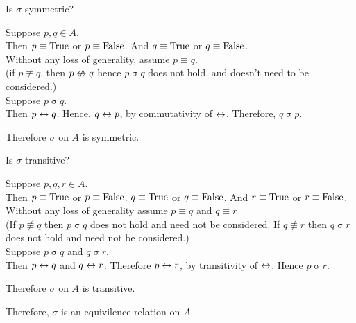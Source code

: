 \documentclass[a4paper, 11pt]{report}
\newcommand{\bisig}{\mathbin{\sigma}}
\begin{document}
Is $\bisig$ symmetric?
\begin{list}{}{\setlength{\leftmargin}{1in}\setlength{\topsep}{2pt}}\item\relax
  Suppose $p,q\in A$. \\
  Then $p\equiv\text{True}$ or $p\equiv\text{False}$. And $q\equiv\text{True}$ or $q\equiv\text{False}$. \\
  Without any loss of generality, assume $p\equiv q$. \\
  (if $p\not\equiv q$, then $p\notliff q$ hence $p\bisig q$ does not hold, and doesn't need to be considered.) \\
  Suppose $p\bisig q$. \\
  Then $p\leftrightarrow q$. Hence, $q\leftrightarrow p$, by commutativity of $\leftrightarrow$. Therefore, $q\bisig p$.

  Therefore $\bisig$ on $A$ is symmetric.
\end{list}

Is $\bisig$ transitive?
\begin{list}{}{\setlength{\leftmargin}{1in}\setlength{\topsep}{2pt}}\item\relax
  Suppose $p,q,r\in A$. \\
  Then $p\equiv\text{True}$ or $p\equiv\text{False}$. $q\equiv\text{True}$ or $q\equiv\text{False}$. And $r\equiv\text{True}$ or $r\equiv\text{False}$. \\
  Without any loss of generality assume $p\equiv q$ and $q\equiv r$ \\
  (If $p\not\equiv q$ then $p\bisig q$ does not hold and need not be considered. If $q\not\equiv r$ then $q\bisig r$ does not hold and need not be considered.) \\
  Suppose $p\bisig q$ and $q\bisig r$. \\
  Then $p\leftrightarrow q$ and $q\leftrightarrow r$. Therefore $p\leftrightarrow r$, by transitivity of $\leftrightarrow$. Hence $p\bisig r$.

  Therefore $\bisig$ on $A$ is transitive.
\end{list}

Therefore, $\bisig$ is an equivilence relation on $A$.
\end{document}
